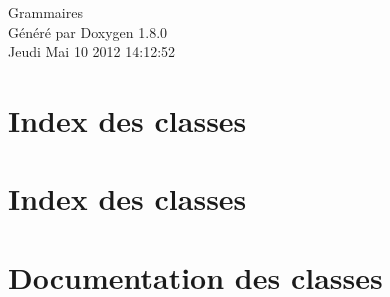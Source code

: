 \documentclass{book}
\begin{document}
\hypersetup{pageanchor=false,citecolor=blue}
\begin{titlepage}
\vspace*{7cm}
\begin{center}
{\Large Grammaires }\\
\vspace*{1cm}
{\large Généré par Doxygen 1.8.0}\\
\vspace*{0.5cm}
{\small Jeudi Mai 10 2012 14:12:52}\\
\end{center}
\end{titlepage}
\clearemptydoublepage
{}
\tableofcontents
\clearemptydoublepage
{}
\hypersetup{pageanchor=true,citecolor=blue}
\chapter{Index des classes}

\chapter{Index des classes}

\chapter{Documentation des classes}



































\printindex
\end{document}
